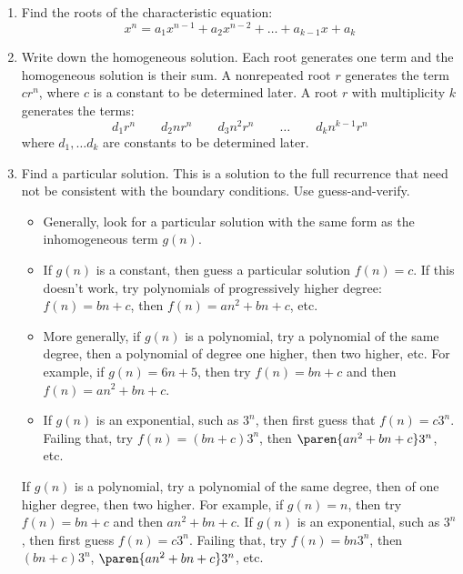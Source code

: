 \begin{enumerate}
\item Find the roots of the characteristic equation:
\begin{equation*}
x^n = a_1 x^{n-1} + a_2 x^{n-2} + \ldots + a_{k-1} x + a_k
\end{equation*}
\item Write down the homogeneous solution.  Each root generates one
  term and the homogeneous solution is their sum.  A nonrepeated root
  $r$ generates the term $c r^n$, where $c$ is a constant to be
  determined later.  A root $r$ with multiplicity $k$ generates the
  terms:
\[
d_{1} r^n \qquad d_2 n r^n \qquad d_3 n^2 r^n \qquad \ldots \qquad d_k n^{k-1} r^n
\]
where $d_1, \ldots d_k$ are constants to be determined later.

\item Find a particular solution.  This is a solution to the full
  recurrence that need not be consistent with the boundary
  conditions.  Use guess-and-verify.  

\begin{itemize}
\item Generally, look for a particular solution with the same form as
  the inhomogeneous term $g(n)$.
\item If $g(n)$ is a constant, then guess a particular solution $f(n)
  = c$.  If this doesn't work, try polynomials of progressively higher
  degree:  $f(n)=bn+c$, then $f(n)=an^2 +bn+c$, etc.
\item More generally, if $g(n)$ is a polynomial, try a polynomial of
  the same degree, then a polynomial of degree one higher, then two
  higher, etc. For example, if $g(n) = 6n + 5$, then try $f(n)=bn+c$
  and then $f(n)=an^2 +bn+c$.
\item If $g(n)$ is an exponential, such as $3^n$, then first guess
  that $f(n) = c3^n$.  Failing that, try $f(n) = (bn + c)3^n$, then
  $\paren{an^2 + bn + c}3^n$, etc.
\end{itemize}

\begin{editingnotes}

If $g(n)$ is a polynomial, try a
  polynomial of the same degree, then of one higher degree, then two
  higher.  For example, if $g(n) = n$, then try $f(n) = bn + c$ and
  then $an^2 + bn + c$.  If $g(n)$ is an exponential, such as $3^n$,
  then first guess $f(n) = c3^n$.  Failing that, try $f(n) = bn3^n$, then
  $(bn + c)3^n$, $\paren{an^2 + bn + c}3^n$, etc.
\end{editingnotes}


\end{enumerate}
